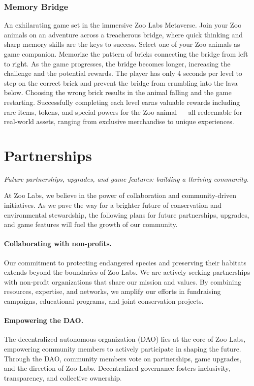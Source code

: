\subsubsection{Memory Bridge}

An exhilarating game set in the immersive Zoo Labs Metaverse. Join your Zoo animals on an adventure across a treacherous bridge, where quick thinking and sharp memory skills are the keys to success. Select one of your Zoo animals as game companion. Memorize the pattern of bricks connecting the bridge from left to right. As the game progresses, the bridge becomes longer, increasing the challenge and the potential rewards. The player has only 4 seconds per level to step on the correct brick and prevent the bridge from crumbling into the lava below. Choosing the wrong brick results in the animal falling and the game restarting. Successfully completing each level earns valuable rewards including rare items, tokens, and special powers for the Zoo animal --- all redeemable for real-world assets, ranging from exclusive merchandise to unique experiences.

\section{Partnerships}
\label{sec:partnerships}

\textit{Future partnerships, upgrades, and game features: building a thriving community.}

At Zoo Labs, we believe in the power of collaboration and community-driven initiatives. As we pave the way for a brighter future of conservation and environmental stewardship, the following plans for future partnerships, upgrades, and game features will fuel the growth of our community.

\paragraph{Collaborating with non-profits.} Our commitment to protecting endangered species and preserving their habitats extends beyond the boundaries of Zoo Labs. We are actively seeking partnerships with non-profit organizations that share our mission and values. By combining resources, expertise, and networks, we amplify our efforts in fundraising campaigns, educational programs, and joint conservation projects.

\paragraph{Empowering the DAO.} The decentralized autonomous organization (DAO) lies at the core of Zoo Labs, empowering community members to actively participate in shaping the future. Through the DAO, community members vote on partnerships, game upgrades, and the direction of Zoo Labs. Decentralized governance fosters inclusivity, transparency, and collective ownership.

